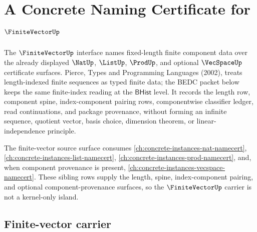 \chapter{A Concrete Naming Certificate for $\FiniteVectorUp$}
\label{ch:concrete-instances-finitevector-namecert}

The $\FiniteVectorUp$ interface names fixed-length finite component data over the already displayed $\NatUp$, $\ListUp$, $\ProdUp$, and optional $\VecSpaceUp$ certificate surfaces. Pierce, Types and Programming Languages (2002), treats length-indexed finite sequences as typed finite data; the BEDC packet below keeps the same finite-index reading at the $\mathsf{BHist}$ level. It records the length row, component spine, index-component pairing rows, componentwise classifier ledger, read continuations, and package provenance, without forming an infinite sequence, quotient vector, basis choice, dimension theorem, or linear-independence principle.

The finite-vector source surface consumes \autoref{ch:concrete-instances-nat-namecert}, \autoref{ch:concrete-instances-list-namecert}, \autoref{ch:concrete-instances-prod-namecert}, and, when component provenance is present, \autoref{ch:concrete-instances-vecspace-namecert}. These sibling rows supply the length, spine, index-component pairing, and optional component-provenance surfaces, so the $\FiniteVectorUp$ carrier is not a kernel-only island.

\section{Finite-vector carrier}
\label{sec:finitevector-carrier}

